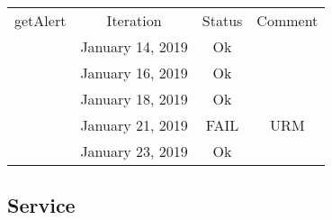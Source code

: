 \documentclass{scrreprt}
\begin{document}
	\\ \\ \\
	\begin{tabularx}{12cm}{X|c|c|c}
		getAlert & Iteration & Status & Comment \\
		& January 14, 2019 & Ok & \\
		& January 16, 2019 & Ok & \\
		& January 18, 2019 & Ok & \\
		& January 21, 2019 & FAIL & URM \\
		& January 23, 2019 & Ok & \\
	\end{tabularx}
	
	\subsection{Service}
\end{document}
